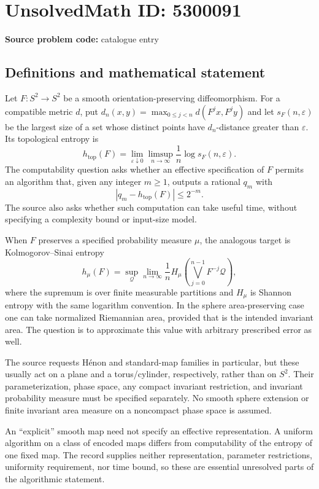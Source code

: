 \documentclass[11pt]{article}
\begin{document}
\section*{UnsolvedMath ID: 5300091}
\textbf{Source problem code:} catalogue entry
\subsection{Definitions and mathematical statement}
Let $F:S^2\to S^2$ be a smooth orientation-preserving diffeomorphism. For a compatible metric $d$, put $d_n(x,y)=\max_{0\leq j<n}d(F^jx,F^jy)$ and let $s_F(n,\varepsilon)$ be the largest size of a set whose distinct points have $d_n$-distance greater than $\varepsilon$. Its topological entropy is
\[
h_{\mathrm{top}}(F)=\lim_{\varepsilon\downarrow0}\limsup_{n\to\infty}\frac1n\log s_F(n,\varepsilon).
\]
The computability question asks whether an effective specification of $F$ permits an algorithm that, given any integer $m\geq1$, outputs a rational $q_m$ with
\[
|q_m-h_{\mathrm{top}}(F)|\leq2^{-m}.
\]
The source also asks whether such computation can take useful time, without specifying a complexity bound or input-size model.

When $F$ preserves a specified probability measure $\mu$, the analogous target is Kolmogorov--Sinai entropy
\[
h_\mu(F)=\sup_{\mathcal Q}\lim_{n\to\infty}\frac1n
H_\mu\left(\bigvee_{j=0}^{n-1}F^{-j}\mathcal Q\right),
\]
where the supremum is over finite measurable partitions and $H_\mu$ is Shannon entropy with the same logarithm convention. In the sphere area-preserving case one can take normalized Riemannian area, provided that is the intended invariant area. The question is to approximate this value with arbitrary prescribed error as well.

The source requests H\'enon and standard-map families in particular, but these usually act on a plane and a torus/cylinder, respectively, rather than on $S^2$. Their parameterization, phase space, any compact invariant restriction, and invariant probability measure must be specified separately. No smooth sphere extension or finite invariant area measure on a noncompact phase space is assumed.

An ``explicit'' smooth map need not specify an effective representation. A uniform algorithm on a class of encoded maps differs from computability of the entropy of one fixed map. The record supplies neither representation, parameter restrictions, uniformity requirement, nor time bound, so these are essential unresolved parts of the algorithmic statement.
\end{document}
